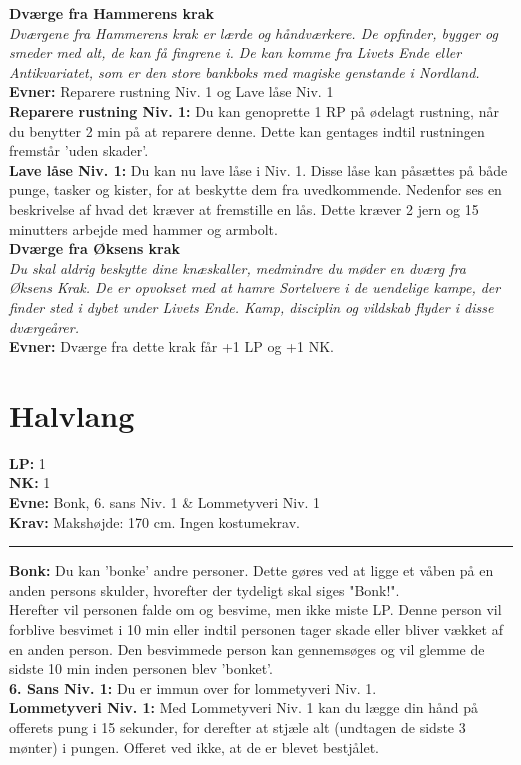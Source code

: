 \textbf{Dværge fra Hammerens krak}\\
\textit{Dværgene fra Hammerens krak er lærde og håndværkere. De opfinder, bygger og smeder med alt, de kan få fingrene i. De kan komme fra Livets Ende eller Antikvariatet, som er den store bankboks med magiske genstande i Nordland.}\\
\textbf{Evner:} Reparere rustning Niv. 1 og Lave låse Niv. 1\\
\textbf{Reparere rustning Niv. 1:} Du kan genoprette 1 RP på ødelagt rustning, når du benytter 2 min på at reparere denne. Dette kan gentages indtil rustningen fremstår 'uden skader'.\\
\textbf{Lave låse Niv. 1:} Du kan nu lave låse i Niv. 1. Disse låse kan påsættes på både punge, tasker og kister, for at beskytte dem fra uvedkommende. Nedenfor ses en beskrivelse af hvad det kræver at fremstille en lås. Dette kræver 2 jern og 15 minutters arbejde med hammer og armbolt.\\


\textbf{Dværge fra Øksens krak}\\
\textit{Du skal aldrig beskytte dine knæskaller, medmindre du møder en dværg fra Øksens Krak. De er opvokset med at hamre Sortelvere i de uendelige kampe, der finder sted i dybet under Livets Ende. Kamp, disciplin og vildskab flyder i disse dværgeårer.}\\
\textbf{Evner:} Dværge fra dette krak får +1 LP og +1 NK.

\newpage
\section*{Halvlang}
\begin{race*}[Halvlange]
\textbf{LP:} 1\\ 
\textbf{NK:} 1\\ 
\textbf{Evne:} Bonk, 6. sans Niv. 1 \& Lommetyveri Niv. 1\\
\textbf{Krav:} Makshøjde: 170 cm. Ingen kostumekrav.\\
\rule{\textwidth}{0.4pt}
\textbf{Bonk:} Du kan 'bonke' andre personer. Dette gøres ved at ligge et våben på en anden persons skulder, hvorefter der tydeligt skal siges "Bonk!".\\
Herefter vil personen falde om og besvime, men ikke miste LP. Denne person vil forblive besvimet i 10 min eller indtil personen tager skade eller bliver vækket af en anden person. Den besvimmede person kan gennemsøges og vil glemme de sidste 10 min inden personen blev 'bonket'.\\
\textbf{6. Sans Niv. 1:} Du er immun over for lommetyveri Niv. 1.\\
\textbf{Lommetyveri Niv. 1:} Med Lommetyveri Niv. 1 kan du lægge din hånd på offerets pung i 15 sekunder, for derefter at stjæle alt (undtagen de sidste 3 mønter) i pungen. Offeret ved ikke, at de er blevet bestjålet.\\
\end{race*}

